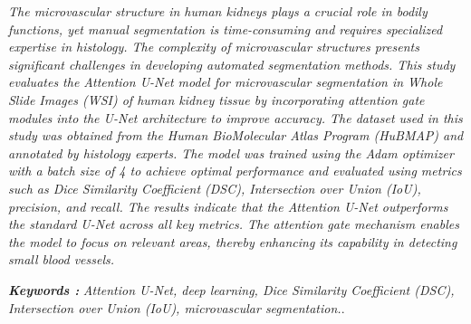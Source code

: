 \begin{abstracteng}
\justifying
\emph{
The microvascular structure in human kidneys plays a crucial role in bodily functions, yet manual segmentation is time-consuming and requires specialized expertise in histology. The complexity of microvascular structures presents significant challenges in developing automated segmentation methods. This study evaluates the Attention U-Net model for microvascular segmentation in Whole Slide Images (WSI) of human kidney tissue by incorporating attention gate modules into the U-Net architecture to improve accuracy. The dataset used in this study was obtained from the Human BioMolecular Atlas Program (HuBMAP) and annotated by histology experts. The model was trained using the Adam optimizer with a batch size of 4 to achieve optimal performance and evaluated using metrics such as Dice Similarity Coefficient (DSC), Intersection over Union (IoU), precision, and recall. The results indicate that the Attention U-Net outperforms the standard U-Net across all key metrics. The attention gate mechanism enables the model to focus on relevant areas, thereby enhancing its capability in detecting small blood vessels.}

\bigskip
\noindent
\textbf{\emph{Keywords :}} \emph{Attention U-Net, deep learning, Dice Similarity Coefficient (DSC), Intersection over Union (IoU), microvascular segmentation.}.
\end{abstracteng}
